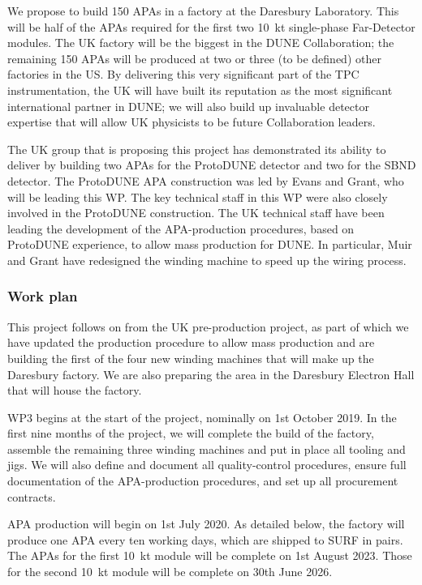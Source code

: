 We propose to build 150 APAs in a factory at the Daresbury Laboratory. This will be half of the APAs required for the first two \SI{10}{\kilo\tonne} single-phase Far-Detector modules. The UK factory will be the biggest in the DUNE Collaboration; the remaining 150 APAs will be produced at two or three (to be defined) other factories in the US. By delivering this very significant part of the TPC instrumentation, the UK will have built its reputation as the most significant international partner in DUNE; we will also build up invaluable detector expertise that will allow UK physicists to be future Collaboration leaders.

The UK group that is proposing this project has demonstrated its ability to deliver by building two APAs for the ProtoDUNE detector and two for the SBND detector. The ProtoDUNE APA construction was led by Evans and Grant, who will be leading this WP. The key technical staff in this WP were also closely involved in the ProtoDUNE construction. The UK technical staff have been leading the development of the APA-production procedures, based on ProtoDUNE experience, to allow mass production for DUNE. In particular, Muir and Grant have redesigned the winding machine to speed up the wiring process.


\subsubsection{Work plan}

This project follows on from the UK pre-production project, as part of which we have updated the production procedure to allow mass production and are building the first of the four new winding machines that will make up the Daresbury factory. We are also preparing the area in the Daresbury Electron Hall that will house the factory.

WP3 begins at the start of the project, nominally on 1st October 2019. In the first nine months of the project, we will complete the build of the factory, assemble the remaining three winding machines and put in place all tooling and jigs. We will also define and document all quality-control procedures, ensure full documentation of the APA-production procedures, and set up all procurement contracts.

APA production will begin on 1st July 2020. As detailed below, the factory will produce one APA every ten working days, which are shipped to SURF in pairs. The APAs for the first \SI{10}{\kilo\tonne} module will be complete on 1st August 2023. Those for the second \SI{10}{\kilo\tonne} module will be complete on 30th June 2026.

